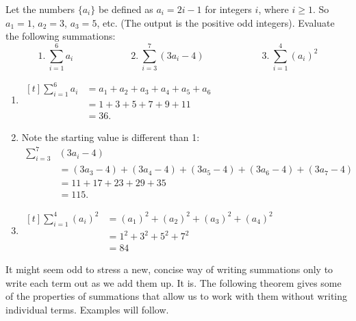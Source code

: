\begin{example}\label{ex_rie3}
Let the numbers $\{a_i\}$ be defined as $a_i = 2i-1$ for integers $i$, where $i\geq 1$. So $a_1 = 1$, $a_2 = 3$, $a_3 = 5$, etc. (The output is the positive odd integers). Evaluate the following summations:
\[ 1.\ \sum_{i=1}^6 a_i \qquad\qquad\qquad 2.\ \sum_{i=3}^7 (3a_i-4)\qquad\qquad \qquad 3.\ \sum_{i=1}^4 (a_i)^2\]
\solution
\begin{enumerate}
	\item \hfill$\begin{aligned}[t]
			\sum_{i=1}^6 a_i &= a_1+a_2+a_3+a_4+a_5+a_6\\
			&=	1+3+5+7+9+11 \\
			&=	36.
		\end{aligned}$\hfill\null
	\item	Note the starting value is different than 1:
		\begin{align*}
			\sum_{i=3}^7 &(3a_i-4)\\
			&= (3a_3-4)+(3a_4-4)+(3a_5-4)+(3a_6-4)+(3a_7-4) \\
			&= 11+17+23+29+35 \\
			&= 115.
		\end{align*}
	\item \hfill$\begin{aligned}[t]
			\sum_{i=1}^4 (a_i)^2 &=	(a_1)^2+(a_2)^2+(a_3)^2+(a_4)^2\\
			&=	1^2+3^2+5^2+7^2 \\
			&=	84
		\end{aligned}$\hfill\null
\end{enumerate}
\end{example}

It might seem odd to stress a new, concise way of writing summations only to write each term out as we add them up. It is. The following theorem gives some of the properties of summations that allow us to work with them without writing individual terms. Examples will follow.

